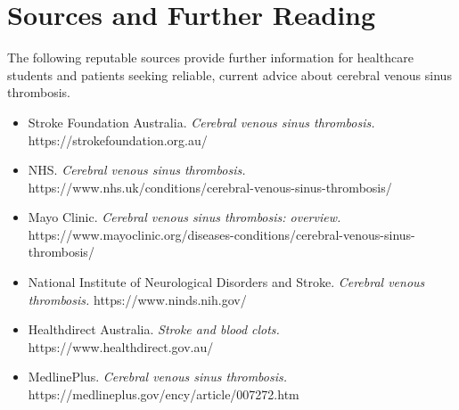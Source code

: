 \section*{Sources and Further Reading}
The following reputable sources provide further information for healthcare students and patients seeking reliable, current advice about cerebral venous sinus thrombosis.

\begin{itemize}
    \item Stroke Foundation Australia. \textit{Cerebral venous sinus thrombosis.} https://strokefoundation.org.au/
    \item NHS. \textit{Cerebral venous sinus thrombosis.} https://www.nhs.uk/conditions/cerebral-venous-sinus-thrombosis/
    \item Mayo Clinic. \textit{Cerebral venous sinus thrombosis: overview.} https://www.mayoclinic.org/diseases-conditions/cerebral-venous-sinus-thrombosis/
    \item National Institute of Neurological Disorders and Stroke. \textit{Cerebral venous thrombosis.} https://www.ninds.nih.gov/
    \item Healthdirect Australia. \textit{Stroke and blood clots.} https://www.healthdirect.gov.au/
    \item MedlinePlus. \textit{Cerebral venous sinus thrombosis.} https://medlineplus.gov/ency/article/007272.htm
\end{itemize}
